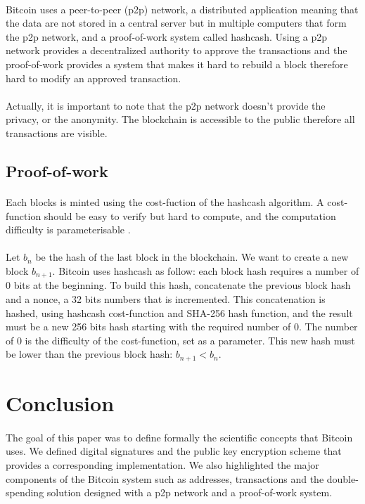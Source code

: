 \documentclass[letterpaper]{article}
\begin{document}
\paragraph{}
Bitcoin uses a peer-to-peer (p2p) network,
a distributed application meaning that the data are not stored in a
central server but in multiple computers that form the p2p network,
and a proof-of-work system called hashcash\cite{hashcash}. Using a p2p network
provides a decentralized authority to approve the transactions and
the proof-of-work provides a system that makes it hard to rebuild
a block therefore hard to modify an approved transaction.

\paragraph{}
Actually, it is important to note that the p2p network doesn't provide
the privacy, or the anonymity. The blockchain is accessible to the public
therefore all transactions are visible.

\subsection{Proof-of-work}
\label{proof}
\paragraph{}
Each blocks is minted using the cost-fuction of the hashcash
algorithm.
A cost-function should be easy to verify but hard to compute, and the
computation difficulty is parameterisable \cite{hashcash}.
\paragraph{}
Let $b_n$ be the hash
of the last block in the blockchain.
We want to create a new block $b_{n+1}$. Bitcoin uses hashcash as follow:
each block hash requires a number of 0 bits at the beginning. To build this
hash, concatenate the previous block hash and a nonce, a 32 bits numbers
that is incremented. This concatenation is hashed, using hashcash cost-function
 and SHA-256 hash function,
and the result
must be a new 256 bits hash starting with the required number of 0.
The number of 0 is the difficulty of the cost-function, set as a parameter.
This new hash must be lower than the previous block hash: $b_{n+1} < b_n$.

\section*{Conclusion}

\paragraph{}
The goal of this paper was to define formally the scientific concepts
that Bitcoin uses. We defined digital
signatures and the public key encryption scheme that provides a corresponding
implementation. We also highlighted the major components of the Bitcoin
system such as addresses, transactions and the double-spending solution
designed with a p2p network and a proof-of-work system.



\end{document}

